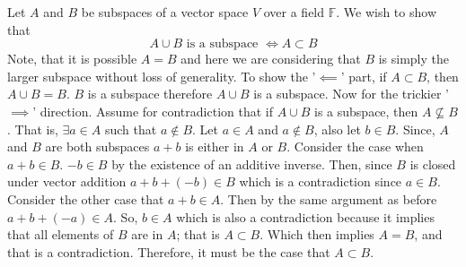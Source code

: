 \documentclass[10pt, twocolumn]{article}
\newcommand{\F}{\mathbb{F}}
\begin{document}
\begin{q}[Problem 12]
    Let $ A $ and $ B $ be subspaces of a vector space $ V $ over a field $ \F $.
    We wish to show that
    $$ A \cup B \text{ is a subspace } \iff A \subset B $$
    Note, that it is possible $ A = B $ and here we are considering that $ B $ is simply the larger subspace without loss of generality. 
    To show the '$\impliedby$' part, if $ A \subset B $, then $ A \cup B = B $. $ B $ is a subspace therefore $ A \cup B $ is a subspace.
    Now for the trickier '$\implies$' direction.
    Assume for contradiction that if $ A \cup B $ is a subspace, then $ A \not\subseteq B $. 
    That is, $ \exists a \in A $ such that $ a \not\in B $. 
    Let $ a \in A $ and $ a \not\in B $, also let $ b \in B $.  
    Since, $ A $ and $ B $ are both subspaces 
    $ a + b $ is either in $ A $ or $ B $. 
    Consider the case when $ a + b \in B $. 
    $ -b \in B $ by the existence of an additive inverse. 
    Then, since $ B $ is closed under vector addition 
    $ a + b + (-b) \in B $ which is a contradiction since $ a \in B $. 
    Consider the other case that $ a +b \in A $. Then by the same argument as before
    $ a + b + (-a) \in A $. So, $ b \in A $ which is also a contradiction because it implies that all elements of $ B $ are in $ A $; 
    that is $ A \subset B $. Which then implies $ A = B $, and that is a contradiction. 
    Therefore, it must be the case that $ A \subset B $.  
\end{q}
\end{document}
